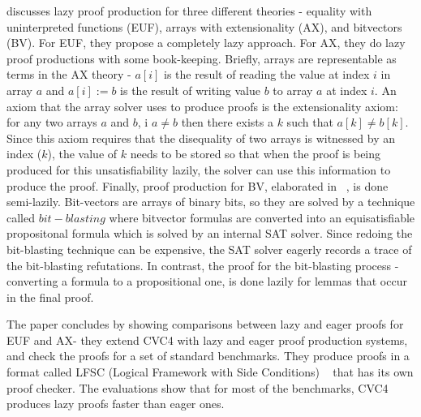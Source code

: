 \documentclass{article}
\begin{document}
\cite{DBLP:conf/fmcad/KatzBTRH16} discusses lazy proof 
production for three different theories - equality with
uninterpreted functions (EUF), arrays with extensionality 
(AX), and bitvectors (BV). For EUF, they propose a 
completely lazy approach. For AX, they do lazy proof 
productions with some book-keeping. Briefly, arrays are 
representable as terms in the AX theory - $a[i]$ is 
the result of reading the value at index $i$ in array $a$
and $a[i] := b$ is the result of writing value $b$ to 
array $a$ at index $i$. An axiom that the array solver 
uses to produce proofs is the extensionality axiom:
for any two arrays $a$ and $b$, i $a \neq b$ then 
there exists a $k$ such that $a[k] \neq b[k]$.
Since this axiom requires that the disequality of two 
arrays is witnessed by an index ($k$), the value of
$k$ needs to be stored so that when the proof is 
being produced for this unsatisfiability lazily, the 
solver can use this information to produce the proof.
Finally, proof production for BV, elaborated in 
~\cite{DBLP:conf/lpar/HadareanBRTD15}, is done 
semi-lazily. Bit-vectors are arrays of binary bits, 
so they are solved by a technique called $bit-blasting$
where bitvector formulas are converted into an 
equisatisfiable propositonal formula which is solved 
by an internal SAT solver. Since redoing the 
bit-blasting technique can be expensive, the SAT 
solver eagerly records a trace of the bit-blasting 
refutations. In contrast, the proof for the 
bit-blasting process - converting a formula 
to a propositional one, is done lazily for lemmas 
that occur in the final proof. 

The paper concludes by showing comparisons between 
lazy and eager proofs for EUF and AX- 
they extend CVC4 with lazy and eager proof production
systems, and check the proofs for a set of 
standard benchmarks. They produce proofs in a 
format called LFSC (Logical Framework with Side Conditions)
~\cite{DBLP:journals/fmsd/StumpORHT13} that has its own
proof checker. The evaluations show that for most 
of the benchmarks, CVC4 produces lazy proofs faster 
than eager ones.
\end{document}
